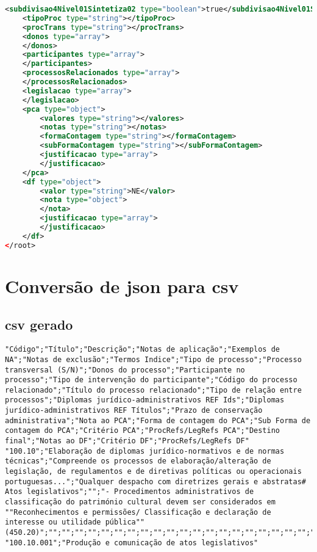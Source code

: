 \begin{lstlisting}[language=xml, caption=\acrshort{xml} resultante da conversão do \acrshort{json} presente em~\ref{exem:json}]
    <subdivisao4Nivel01Sintetiza02 type="boolean">true</subdivisao4Nivel01Sintetiza02>
    <tipoProc type="string"></tipoProc>
    <procTrans type="string"></procTrans>
    <donos type="array">
    </donos>
    <participantes type="array">
    </participantes>
    <processosRelacionados type="array">
    </processosRelacionados>
    <legislacao type="array">
    </legislacao>
    <pca type="object">
        <valores type="string"></valores>
        <notas type="string"></notas>
        <formaContagem type="string"></formaContagem>
        <subFormaContagem type="string"></subFormaContagem>
        <justificacao type="array">
        </justificacao>
    </pca>
    <df type="object">
        <valor type="string">NE</valor>
        <nota type="object">
        </nota>
        <justificacao type="array">
        </justificacao>
    </df>
</root>
\end{lstlisting}

\section{Conversão de \acrshort{json} para \acrshort{csv}}\label{conv:jsonTOcsv}

\subsection{\acrshort{csv} gerado}
\begin{lstlisting}[language=pseudocode, caption=\acrshort{csv} resultante da conversão do \acrshort{json} presente em~\ref{exem:json}]
"Código";"Título";"Descrição";"Notas de aplicação";"Exemplos de NA";"Notas de exclusão";"Termos Indice";"Tipo de processo";"Processo transversal (S/N)";"Donos do processo";"Participante no processo";"Tipo de intervenção do participante";"Código do processo relacionado";"Título do processo relacionado";"Tipo de relação entre processos";"Diplomas jurídico-administrativos REF Ids";"Diplomas jurídico-administrativos REF Títulos";"Prazo de conservação administrativa";"Nota ao PCA";"Forma de contagem do PCA";"Sub Forma de contagem do PCA";"Critério PCA";"ProcRefs/LegRefs PCA";"Destino final";"Notas ao DF";"Critério DF";"ProcRefs/LegRefs DF"
"100.10";"Elaboração de diplomas jurídico-normativos e de normas técnicas";"Compreende os processos de elaboração/alteração de legislação, de regulamentos e de diretivas políticas ou operacionais portuguesas...";"Qualquer despacho com diretrizes gerais e abstratas#
Atos legislativos";"";"- Procedimentos administrativos de classificação do património cultural devem ser considerados em ""Reconhecimentos e permissões/ Classificação e declaração de interesse ou utilidade pública"" (450.20)";"";"";"";"";"";"";"";"";"";"";"";"";"";"";"";"";"";"";"";"";""
"100.10.001";"Produção e comunicação de atos legislativos"
\end{lstlisting}


